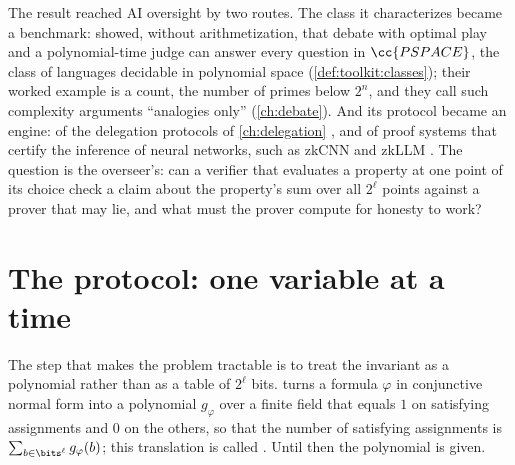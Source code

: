 \begin{refsection}
The result reached AI oversight by two routes. The class it characterizes became a benchmark: \textcite{IrvingEtAl2018} showed, without arithmetization, that debate with optimal play and a polynomial-time judge can answer every question in $\cc{PSPACE}$, the class of languages decidable in polynomial space (\cref{def:toolkit:classes}); their worked example is a count, the number of primes below $2^n$, and they call such complexity arguments ``analogies only'' (\cref{ch:debate}). And its protocol became an engine: of the delegation protocols of \cref{ch:delegation} \parencite{GoldwasserKalaiRothblum2015}, and of proof systems that certify the inference of neural networks, such as zkCNN and zkLLM \parencite{LiuXieZhang2021,SunLiZhang2024}. The question is the overseer's: can a verifier that evaluates a property at one point of its choice check a claim about the property's sum over all $2^\ell$ points against a prover that may lie, and what must the prover compute for honesty to work?

\section{The protocol: one variable at a time}\label{sec:sumcheck:protocol}

The step that makes the problem tractable is to treat the invariant as a polynomial rather than as a table of $2^\ell$ bits.  turns a formula $\varphi$ in conjunctive normal form into a polynomial $g_\varphi$ over a finite field that equals $1$ on satisfying assignments and $0$ on the others, so that the number of satisfying assignments is $\sum_{b\in\bits^\ell}g_\varphi(b)$; this translation is called . Until then the polynomial is given.



\end{refsection}
